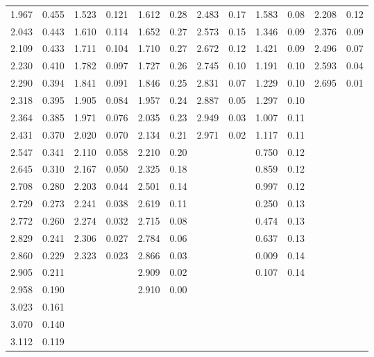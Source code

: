 \begin{table*}
\begin{tabular}{|cc|cc|cc|cc|cc|cc|}
    1.967 & 0.455 & 1.523 & 0.121 & 1.612 & 0.28 & 2.483 & 0.17 & 1.583 & 0.08 & 2.208 & 0.12 \\
    2.043 & 0.443 & 1.610 & 0.114 & 1.652 & 0.27 & 2.573 & 0.15 & 1.346 & 0.09 & 2.376 & 0.09 \\
    2.109 & 0.433 & 1.711 & 0.104 & 1.710 & 0.27 & 2.672 & 0.12 & 1.421 & 0.09 & 2.496 & 0.07 \\
    2.230 & 0.410 & 1.782 & 0.097 & 1.727 & 0.26 & 2.745 & 0.10 & 1.191 & 0.10 & 2.593 & 0.04 \\
    2.290 & 0.394 & 1.841 & 0.091 & 1.846 & 0.25 & 2.831 & 0.07 & 1.229 & 0.10 & 2.695 & 0.01 \\
    2.318 & 0.395 & 1.905 & 0.084 & 1.957 & 0.24 & 2.887 & 0.05 & 1.297 & 0.10 &  &  \\
    2.364 & 0.385 & 1.971 & 0.076 & 2.035 & 0.23 & 2.949 & 0.03 & 1.007 & 0.11 &  &  \\
    2.431 & 0.370 & 2.020 & 0.070 & 2.134 & 0.21 & 2.971 & 0.02 & 1.117 & 0.11 &  &  \\
    2.547 & 0.341 & 2.110 & 0.058 & 2.210 & 0.20 &  &  & 0.750 & 0.12 &  &  \\
    2.645 & 0.310 & 2.167 & 0.050 & 2.325 & 0.18 &  &  & 0.859 & 0.12 &  &  \\
    2.708 & 0.280 & 2.203 & 0.044 & 2.501 & 0.14 &  &  & 0.997 & 0.12 &  &  \\
    2.729 & 0.273 & 2.241 & 0.038 & 2.619 & 0.11 &  &  & 0.250 & 0.13 &  &  \\
    2.772 & 0.260 & 2.274 & 0.032 & 2.715 & 0.08 &  &  & 0.474 & 0.13 &  &  \\
    2.829 & 0.241 & 2.306 & 0.027 & 2.784 & 0.06 &  &  & 0.637 & 0.13 &  &  \\
    2.860 & 0.229 & 2.323 & 0.023 & 2.866 & 0.03 &  &  & 0.009 & 0.14 &  &  \\
    2.905 & 0.211 &  &  & 2.909 & 0.02 &  &  & 0.107 & 0.14 &  &  \\
    2.958 & 0.190 &  &  & 2.910 & 0.00 &  &  &  &  &  &  \\
    3.023 & 0.161 &  &  &  &  &  &  &  &  &  &  \\
    3.070 & 0.140 &  &  &  &  &  &  &  &  &  &  \\
    3.112 & 0.119 &  &  &  &  &  &  &  &  &  &  \\

\end{tabular}
\end{table*}
